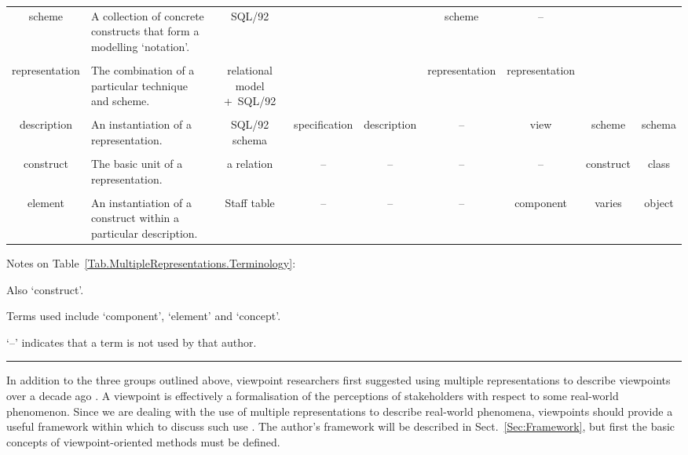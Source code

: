 \documentclass[11pt,oribibl]{llncs}
\begin{document}
\begin{table}
\begin{tabular}{cp{3.7cm}ccccccc}
		\\
		scheme																				&	A collection of concrete constructs that form a modelling `notation'.								&	SQL/92																	&																					&														&	scheme								&	--	\\
		\\
		representation																		&	The combination of a particular technique and scheme.												&	\multicolumn{1}{p{\mrd}}{\centering relational model +~SQL/92}			&																					&														&	representation						&	representation	\\
		\\
		description																			&	An instantiation of a representation.																&	SQL/92 schema															&	specification																	&	description											&	--									&	view												&	scheme												&	schema	\\
		\\
		construct																			&	The basic unit of a representation.																	&	a relation																&	--																				&	--													&	--									&	--													&	construct											&	class\tabnote{\ref{TermD}}	\\
		\\
		element																				&	An instantiation of a construct within a particular description.									&	\textsf{Staff} table													&	--																				&	--													&	--									&	component											&	varies\tabnote{\ref{TermA}}							&	object	\\
	\end{tabular}

	\begin{tabnotes}{Notes on Table~\ref{Tab.MultipleRepresentations.Terminology}:}
		\item\label{TermD} Also `construct'.
		\item\label{TermA} Terms used include `component', `element' and `concept'.
		\item[]	`--' indicates that a term is not used by that author.
	\end{tabnotes}
	\smallskip\hrule
\end{table}


In addition to the three groups outlined above, viewpoint researchers first suggested using multiple representations to describe viewpoints over a decade ago \cite{Fink:ACW:1989}. A viewpoint is effectively a formalisation of the perceptions of stakeholders with respect to some real-world phenomenon. Since we are dealing with the use of multiple representations to describe real-world phenomena, viewpoints should provide a useful framework within which to discuss such use \cite{Stan:N:1997:ECIS97}. The author's framework will be described in Sect.~\ref{Sec:Framework}, but first the basic concepts of viewpoint-oriented methods must be defined.
\end{document}
